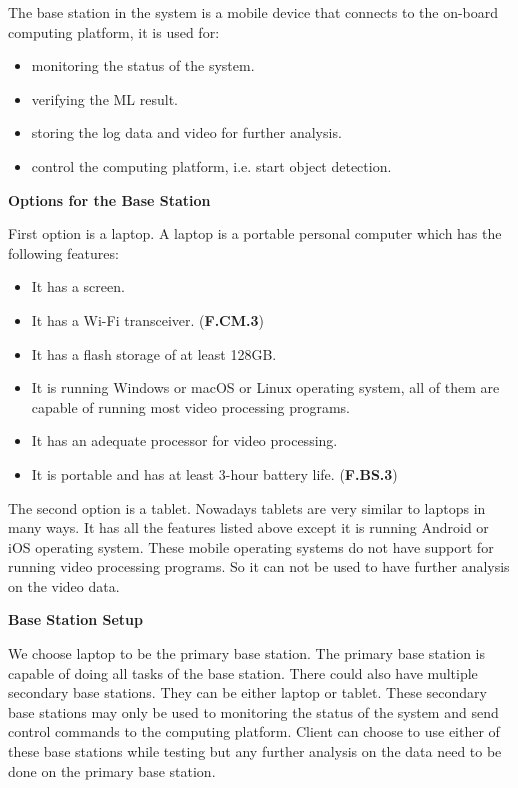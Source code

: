 The base station in the system is a mobile device that connects to the on-board computing platform, it is used for:
\begin{itemize}
    \item monitoring the status of the system.
    \item verifying the ML result.
    \item storing the log data and video for further analysis.
    \item control the computing platform, i.e. start object detection.
\end{itemize}

\textbf{Options for the Base Station}

First option is a laptop. A laptop is a portable personal computer which has the following features:
\begin{itemize}
    \item It has a screen.
    \item It has a Wi-Fi transceiver. (\textbf{F.CM.3})
    \item It has a flash storage of at least 128GB.
    \item It is running Windows or macOS or Linux operating system, all of them are capable of running most video processing programs.
    \item It has an adequate processor for video processing.
    \item It is portable and has at least 3-hour battery life. (\textbf{F.BS.3})
\end{itemize}

The second option is a tablet. Nowadays tablets are very similar to laptops in many ways. It has all the features listed above except it is running Android or iOS operating system. These mobile operating systems do not have support for running video processing programs. So it can not be used to have further analysis on the video data.

\textbf{Base Station Setup}

We choose laptop to be the primary base station. The primary base station is capable of doing all tasks of the base station. There could also have multiple secondary base stations. They can be either laptop or tablet. These secondary base stations may only be used to monitoring the status of the system and send control commands to the computing platform. Client can choose to use either of these base stations while testing but any further analysis on the data need to be done on the primary base station.

